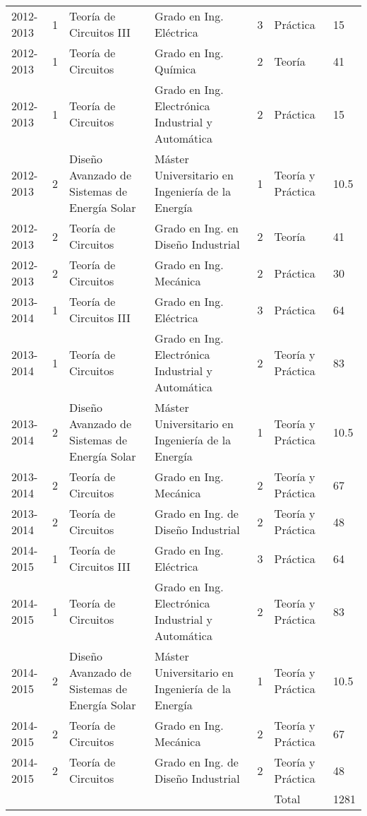 \documentclass[article, a4paper]{memoir}
\begin{document}
\begin{center}
\begin{tabular}{p{18mm}p{10mm}p{40mm}p{40mm}p{10mm}p{15mm}p{10mm}}
\hline
2012-2013 & 1 & Teoría de Circuitos III & Grado en Ing. Eléctrica & 3 & Práctica & 15\\
2012-2013 & 1 & Teoría de Circuitos & Grado en Ing. Química & 2 & Teoría & 41\\
2012-2013 & 1 & Teoría de Circuitos & Grado en Ing. Electrónica Industrial y Automática & 2 & Práctica & 15\\
2012-2013 & 2 & Diseño Avanzado de Sistemas de Energía Solar & Máster Universitario en Ingeniería de la Energía & 1 & Teoría y Práctica & 10.5\\
2012-2013 & 2 & Teoría de Circuitos & Grado en Ing. en Diseño Industrial & 2 & Teoría & 41\\
2012-2013 & 2 & Teoría de Circuitos & Grado en Ing. Mecánica & 2 & Práctica & 30\\
\hline
2013-2014 & 1 & Teoría de Circuitos III & Grado en Ing. Eléctrica & 3 & Práctica & 64\\
2013-2014 & 1 & Teoría de Circuitos & Grado en Ing. Electrónica Industrial y Automática & 2 & Teoría y Práctica & 83\\
2013-2014 & 2 & Diseño Avanzado de Sistemas de Energía Solar & Máster Universitario en Ingeniería de la Energía & 1 & Teoría y Práctica & 10.5\\
2013-2014 & 2 & Teoría de Circuitos & Grado en Ing. Mecánica & 2 & Teoría y Práctica & 67\\
2013-2014 & 2 & Teoría de Circuitos & Grado en Ing. de Diseño Industrial & 2 & Teoría y Práctica & 48\\
\hline
2014-2015 & 1 & Teoría de Circuitos III & Grado en Ing. Eléctrica & 3 & Práctica & 64\\
2014-2015 & 1 & Teoría de Circuitos & Grado en Ing. Electrónica Industrial y Automática & 2 & Teoría y Práctica & 83\\
2014-2015 & 2 & Diseño Avanzado de Sistemas de Energía Solar & Máster Universitario en Ingeniería de la Energía & 1 & Teoría y Práctica & 10.5\\
2014-2015 & 2 & Teoría de Circuitos & Grado en Ing. Mecánica & 2 & Teoría y Práctica & 67\\
2014-2015 & 2 & Teoría de Circuitos & Grado en Ing. de Diseño Industrial & 2 & Teoría y Práctica & 48\\
\hline
 &  &  &  &  & Total & 1281\\
\end{tabular}
\end{center}
\end{document}

